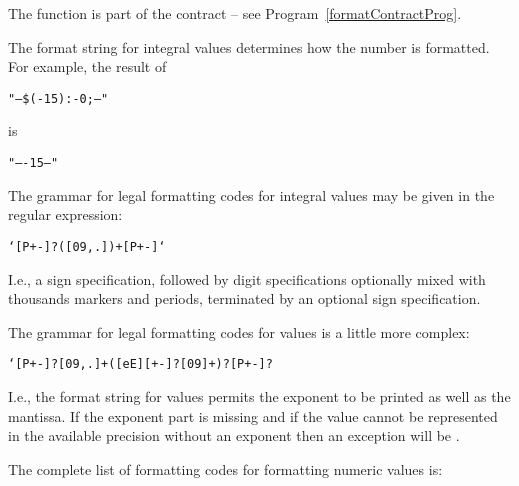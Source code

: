 The  function is part of the  contract -- see Program~\vref{formatContractProg}.

The format string for integral values determines how the number is formatted. For example, the result of
\begin{alltt}
"--\$(-15):-   0;--"
\end{alltt}
is
\begin{alltt}
"--  -15--"
\end{alltt}

The grammar for legal formatting codes for integral values may be given in the regular expression:
\begin{alltt}
`[P+-]?([09 ,.])+[P+-]`
\end{alltt}
I.e., a sign specification, followed by digit specifications optionally mixed with thousands markers and periods, terminated by an optional sign specification.

The grammar for legal formatting codes for  values is a little more complex:
\begin{alltt}
`[P+-]?[09 ,.]+([eE][+-]?[09 ]+)?[P+-]?
\end{alltt}
I.e., the format string for  values permits the exponent to be printed as well as the mantissa. If the exponent part is missing and if the  value cannot be represented in the available precision without an exponent then an exception will be .

The complete list of formatting codes for formatting numeric values is:

